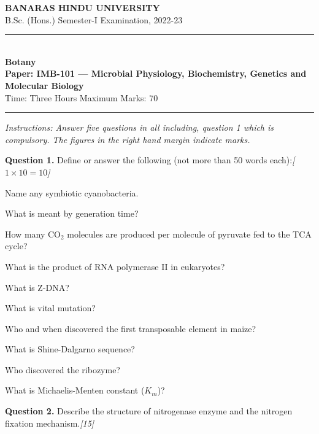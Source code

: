 \documentclass[11pt,a4paper]{article}
\newcommand{\pts}[1]{\hfill   \textit{[#1]}}
\begin{document}
\begin{center}
  {\large\bfseries BANARAS HINDU UNIVERSITY}\\[2pt]
  {\normalsize B.Sc. (Hons.) Semester-I Examination, 2022-23}\\[6pt]
  \rule{0.8\linewidth}{0.5pt}\\[6pt]
  {\large\bfseries Botany}\\[4pt]
  {\large\bfseries Paper: IMB-101 --- Microbial Physiology, Biochemistry, Genetics and Molecular Biology}\\[4pt]
  {\normalsize Time: Three Hours \hfill Maximum Marks: 70}
\end{center}

\rule{\linewidth}{0.4pt}

\smallskip



\noindent   \textit{Instructions: Answer five questions in all including, question 1 which is compulsory. The figures in the right hand margin indicate marks.}

\bigskip

\medskip


\noindent   \textbf{Question 1.} Define or answer the following (not more than 50 words each):\pts{$1  \times 10 = 10$}

\begin{parts}
  \item Name any symbiotic cyanobacteria.
  \item What is meant by generation time?
  \item How many $ \text{CO}_2$ molecules are produced per molecule of pyruvate fed to the TCA cycle?
  \item What is the product of RNA polymerase II in eukaryotes?
  \item What is Z-DNA?
  \item What is vital mutation?
  \item Who and when discovered the first transposable element in maize?
  \item What is Shine-Dalgarno sequence?
  \item Who discovered the ribozyme?
  \item What is Michaelis-Menten constant ($K_m$)?
\end{parts}

\medskip


\noindent   \textbf{Question 2.} Describe the structure of nitrogenase enzyme and the nitrogen fixation mechanism.\pts{15}
\end{document}
